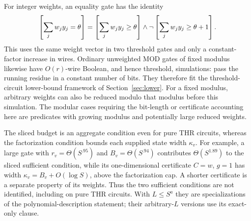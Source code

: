For integer weights, an equality gate has the identity
\begin{equation}\label{eq:equality-thresholds}
 \left[\sum_jw_jy_j=\theta\right]
 =\left[\sum_jw_jy_j\ge\theta\right]
 \wedge\neg\left[\sum_jw_jy_j\ge\theta+1\right].
\end{equation}
This uses the same weight vector in two threshold gates and only a
constant-factor increase in wires. Ordinary unweighted MOD gates of
fixed modulus likewise have $O(r)$-wire Boolean, and hence threshold,
simulations: pass the running residue in a constant number of bits.
They therefore fit the threshold-circuit lower-bound framework of
Section~\ref{sec:lower}. For a fixed modulus, arbitrary weights can
also be reduced modulo that modulus before this simulation. The
modular cases requiring the bit-length or certificate accounting here
are predicates with growing modulus and potentially large reduced
weights.

The sliced budget is an aggregate condition even for pure THR
circuits, whereas the factorization condition bounds each supplied
state width $\kappa_v$. For example, a large gate with
$r_v=\Theta(S^{.95})$ and $B_v=\Theta(S^{.94})$ contributes
$\Theta(S^{1.89})$ to the sliced sufficient condition, while its
one-dimensional certificate $C=w$, $g=1$ has width
$\kappa_v=B_v+O(\log S)$, above the factorization cap.
A shorter certificate is a separate property of its weights. Thus
the two sufficient conditions are not identified, including on pure
THR circuits. With $L\le S^a$ they are specializations of the
polynomial-description statement; their arbitrary-$L$ versions use
its exact-only clause.
